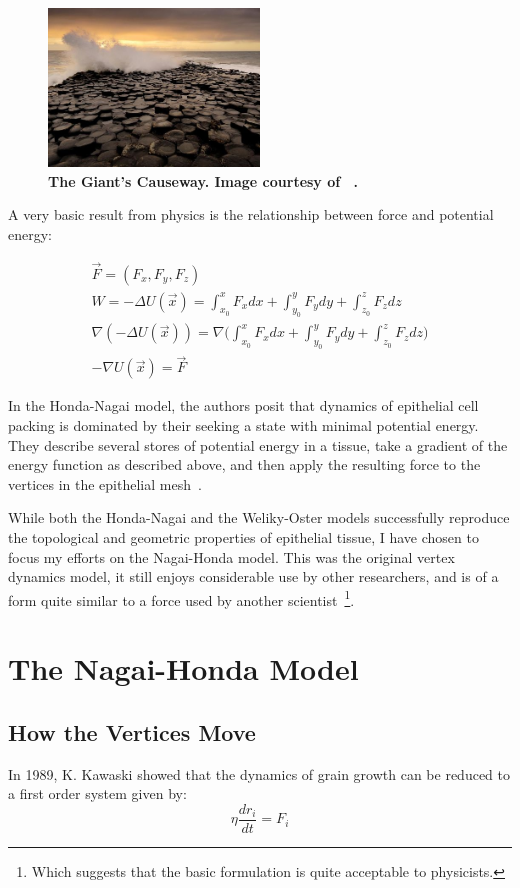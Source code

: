 \begin{figure}[h]
\centering
\includegraphics[width=0.5\textwidth]{../diagrams/resize_giant.jpg}
\caption{\textbf{The Giant's Causeway. Image courtesy of ~\cite{Giant}.}}
\label{fig:cause}
\end{figure}

A very basic result from physics is the relationship between force and potential energy:

\begin{gather}
\vec{F} = (F_x, F_y, F_z)\\
W = -\Delta U(\vec{x}) = \int_{x_0}^xF_xdx+\int_{y_0}^yF_ydy+\int_{z_0}^zF_zdz\\
\nabla(-\Delta U(\vec{x})) = \nabla\Bigg(\int_{x_0}^xF_xdx+\int_{y_0}^yF_ydy+\int_{z_0}^zF_zdz\Bigg)\\
-\nabla U(\vec{x}) = \vec{F}
\end{gather}

In the Honda-Nagai model, the authors posit that dynamics of epithelial cell packing is dominated by their seeking a state with minimal potential energy. They describe several stores of potential energy in a tissue, take a gradient of the energy function as described above, and then apply the resulting force to the vertices in the epithelial mesh~\cite{HondaNagai}.

While both the Honda-Nagai and the Weliky-Oster models successfully reproduce the topological and geometric properties of epithelial tissue, I have chosen to focus my efforts on the Nagai-Honda model. This was the original vertex dynamics model, it still enjoys considerable use by other researchers, and is of a form quite similar to a force used by another scientist~\cite{Farhadifar}\footnote{ Which suggests that the basic formulation is quite acceptable to physicists.}.

\section{The Nagai-Honda Model}
\subsection{How the Vertices Move}
In 1989, K. Kawaski showed that the dynamics of grain growth can be reduced to a first order system given by:
\begin{equation}
\eta\frac{dr_i}{dt} = F_i
\end{equation}

